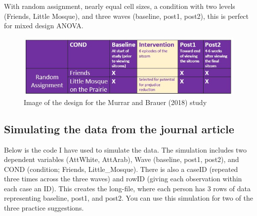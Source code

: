 \documentclass[
  11pt,
]{book}
\begin{document}
With random assignment, nearly equal cell sizes, a condition with two levels (Friends, Little Mosque), and three waves (baseline, post1, post2), this is perfect for mixed design ANOVA.

\begin{figure}
\centering
\includegraphics{images/mixed/Murrar_design.jpg}
\caption{Image of the design for the Murrar and Brauer (2018) study}
\end{figure}

\hypertarget{simulating-the-data-from-the-journal-article}{%
\subsection{Simulating the data from the journal article}\label{simulating-the-data-from-the-journal-article}}

Below is the code I have used to simulate the data. The simulation includes two dependent variables (AttWhite, AttArab), Wave (baseline, post1, post2), and COND (condition; Friends, Little\_Mosque). There is also a caseID (repeated three times across the three waves) and rowID (giving each observation within each case an ID). This creates the long-file, where each person has 3 rows of data representing baseline, post1, and post2. You can use this simulation for two of the three practice suggestions.
\end{document}
